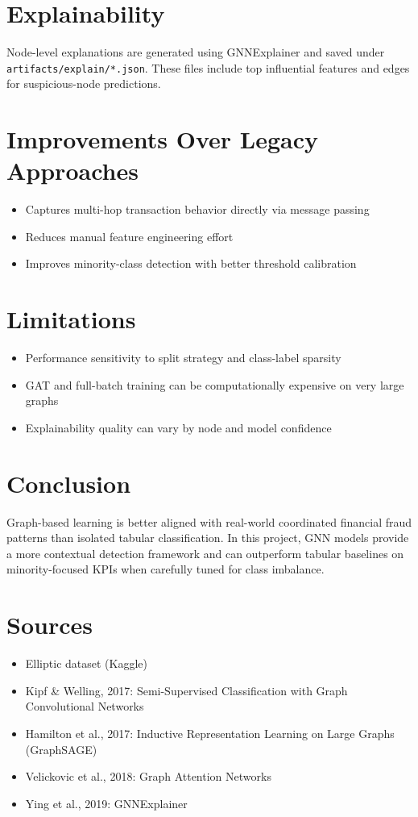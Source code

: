 \documentclass[12pt,a4paper]{article}
\begin{document}
\section{Explainability}
Node-level explanations are generated using GNNExplainer and saved under \texttt{artifacts/explain/*.json}. These files include top influential features and edges for suspicious-node predictions.

\section{Improvements Over Legacy Approaches}
\begin{itemize}
\item Captures multi-hop transaction behavior directly via message passing
\item Reduces manual feature engineering effort
\item Improves minority-class detection with better threshold calibration
\end{itemize}

\section{Limitations}
\begin{itemize}
\item Performance sensitivity to split strategy and class-label sparsity
\item GAT and full-batch training can be computationally expensive on very large graphs
\item Explainability quality can vary by node and model confidence
\end{itemize}

\section{Conclusion}
Graph-based learning is better aligned with real-world coordinated financial fraud patterns than isolated tabular classification. In this project, GNN models provide a more contextual detection framework and can outperform tabular baselines on minority-focused KPIs when carefully tuned for class imbalance.

\section{Sources}
\begin{itemize}
\item Elliptic dataset (Kaggle)
\item Kipf \& Welling, 2017: Semi-Supervised Classification with Graph Convolutional Networks
\item Hamilton et al., 2017: Inductive Representation Learning on Large Graphs (GraphSAGE)
\item Velickovic et al., 2018: Graph Attention Networks
\item Ying et al., 2019: GNNExplainer
\end{itemize}
\end{document}
